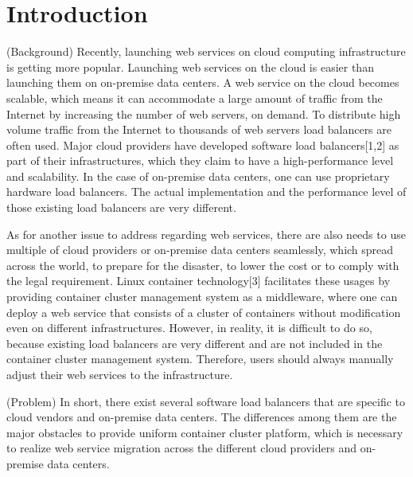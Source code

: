 \section{Introduction}

(Background)
Recently, launching web services on cloud computing infrastructure is getting more popular.
Launching web services on the cloud is easier than launching them on on-premise data centers.
A web service on the cloud becomes scalable, which means it can accommodate a large amount of traffic from the Internet by increasing the number of web servers, on demand.
To distribute high volume traffic from the Internet to thousands of web servers load balancers are often used.
Major cloud providers have developed software load balancers[1,2] as part of their infrastructures, which they claim to have a high-performance level and scalability.
In the case of on-premise data centers, one can use proprietary hardware load balancers.
The actual implementation and the performance level of those existing load balancers are very different.

As for another issue to address regarding web services,
there are also needs to use multiple of cloud providers or on-premise data centers seamlessly, which spread across the world, to prepare for the disaster, to lower the cost or to comply with the legal requirement.
Linux container technology[3] facilitates these usages by providing container cluster management system as a middleware,
where one can deploy a web service that consists of a cluster of containers without modification even on different infrastructures.
However, in reality, it is difficult to do so, because existing load balancers are very different and are not included in the container cluster management system.
Therefore, users should always manually adjust their web services to the infrastructure.

(Problem)
In short, there exist several software load balancers that are specific to cloud vendors and on-premise data centers.
The differences among them are the major obstacles to provide uniform container cluster platform, which is necessary to realize web service migration across the different cloud providers and on-premise data centers.

